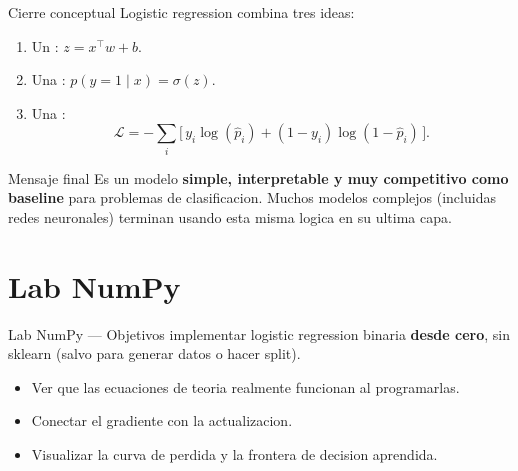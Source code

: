 \begin{frame}{Cierre conceptual}
Logistic regression combina tres ideas:
\begin{enumerate}\small
  \item Un : $z = x^\top w + b$.
  \item Una : $p(y=1\mid x) = \sigma(z)$.
  \item Una :
  \[
  \mathcal{L} = -\sum_i\big[\,y_i\log(\hat p_i) + (1-y_i)\log(1-\hat p_i)\,\big].
  \]
\end{enumerate}

\vspace{0.3em}
\begin{block}{Mensaje final}
\small
Es un modelo \textbf{simple, interpretable y muy competitivo como baseline} para problemas de clasificacion. Muchos modelos complejos (incluidas redes neuronales) terminan usando esta misma logica en su ultima capa.
\end{block}
\end{frame}

\section[Lab NumPy]{Lab NumPy\label{sec:lab-numpy-w11}}

\begin{frame}{Lab NumPy — Objetivos}
 implementar logistic regression binaria \textbf{desde cero}, sin sklearn (salvo para generar datos o hacer split).
\begin{itemize}\small
  \item Ver que las ecuaciones de teoria realmente funcionan al programarlas.
  \item Conectar el gradiente con la actualizacion.
  \item Visualizar la curva de perdida y la frontera de decision aprendida.
\end{itemize}
\end{frame}

